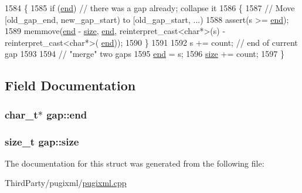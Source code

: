 \begin{DoxyCode}
1584         \{
1585             \textcolor{keywordflow}{if} (\hyperlink{structgap_a1fafd4d9909a3413f723f24e46dfde0e}{end}) \textcolor{comment}{// there was a gap already; collapse it}
1586             \{
1587                 \textcolor{comment}{// Move [old\_gap\_end, new\_gap\_start) to [old\_gap\_start, ...)}
1588                 assert(s >= \hyperlink{structgap_a1fafd4d9909a3413f723f24e46dfde0e}{end});
1589                 memmove(\hyperlink{structgap_a1fafd4d9909a3413f723f24e46dfde0e}{end} - \hyperlink{structgap_ad5bb3597ade78d89bbe0e300748ad508}{size}, \hyperlink{structgap_a1fafd4d9909a3413f723f24e46dfde0e}{end}, reinterpret\_cast<char*>(s) - reinterpret\_cast<char*>(
      \hyperlink{structgap_a1fafd4d9909a3413f723f24e46dfde0e}{end}));
1590             \}
1591                 
1592             s += count; \textcolor{comment}{// end of current gap}
1593                 
1594             \textcolor{comment}{// "merge" two gaps}
1595             \hyperlink{structgap_a1fafd4d9909a3413f723f24e46dfde0e}{end} = s;
1596             \hyperlink{structgap_ad5bb3597ade78d89bbe0e300748ad508}{size} += count;
1597         \}
\end{DoxyCode}


\subsection{Field Documentation}
\hypertarget{structgap_a1fafd4d9909a3413f723f24e46dfde0e}{
\subsubsection[{end}]{\setlength{\rightskip}{0pt plus 5cm}char\-\_\-t$\ast$ gap\-::end}}\label{structgap_a1fafd4d9909a3413f723f24e46dfde0e}
\hypertarget{structgap_ad5bb3597ade78d89bbe0e300748ad508}{
\subsubsection[{size}]{\setlength{\rightskip}{0pt plus 5cm}size\-\_\-t gap\-::size}}\label{structgap_ad5bb3597ade78d89bbe0e300748ad508}


The documentation for this struct was generated from the following file\-:\begin{DoxyCompactItemize}
\item 
Third\-Party/pugixml/\hyperlink{pugixml_8cpp}{pugixml.\-cpp}\end{DoxyCompactItemize}
